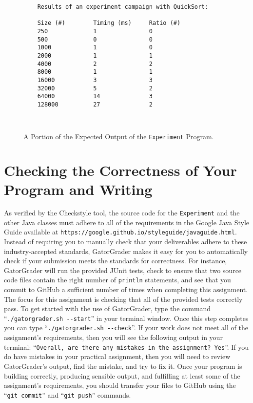 \documentclass[11pt]{article}
\newcommand{\mainprogram}{\lstinline{Experiment}}
\newcommand{\gatorgraderstart}{\command{./gatorgrader.sh --start}}
\newcommand{\gatorgradercheck}{\command{./gatorgrader.sh --check}}
\newcommand{\gitcommit}{\command{git commit}}
\newcommand{\gitpush}{\command{git push}}
\newcommand{\command}[1]{``\lstinline{#1}''}
\newcommand{\program}[1]{\lstinline{#1}}
\newcommand{\url}[1]{\lstinline{#1}}
\begin{document}
\begin{figure}[t]
  \centering
  \begin{verbatim}
    Results of an experiment campaign with QuickSort:

    Size (#)        Timing (ms)     Ratio (#)
    250             1               0
    500             0               0
    1000            1               0
    2000            1               1
    4000            2               2
    8000            1               1
    16000           3               3
    32000           5               2
    64000           14              3
    128000          27              2
  \end{verbatim}

  \vspace*{-.35in}
  \caption{A Portion of the Expected Output of the \mainprogram{} Program.}~\label{fig:output}
  \vspace*{-.25in}
\end{figure}

\section*{Checking the Correctness of Your Program and Writing}

As verified by the Checkstyle tool, the source code for the \mainprogram{} and
the other Java classes must adhere to all of the requirements in the Google Java
Style Guide available at
\url{https://google.github.io/styleguide/javaguide.html}. Instead of requiring
you to manually check that your deliverables adhere to these industry-accepted
standards, GatorGrader makes it easy for you to automatically check if your
submission meets the standards for correctness. For instance, GatorGrader will
run the provided JUnit tests, check to ensure that two source code files contain
the right number of \program{println} statements, and see that you commit to
GitHub a sufficient number of times when completing this assignment. The focus
for this assignment is checking that all of the provided tests correctly pass.
To get started with the use of GatorGrader, type the command \gatorgraderstart{}
in your terminal window. Once this step completes you can type
\gatorgradercheck{}. If your work does not meet all of the assignment's
requirements, then you will see the following output in your terminal:
\command{Overall, are there any mistakes in the assignment? Yes}. If you do have
mistakes in your practical assignment, then you will need to review
GatorGrader's output, find the mistake, and try to fix it. Once your program is
building correctly, producing sensible output, and fulfilling at least some of
the assignment's requirements, you should transfer your files to GitHub using
the \gitcommit{} and \gitpush{} commands.
\end{document}
